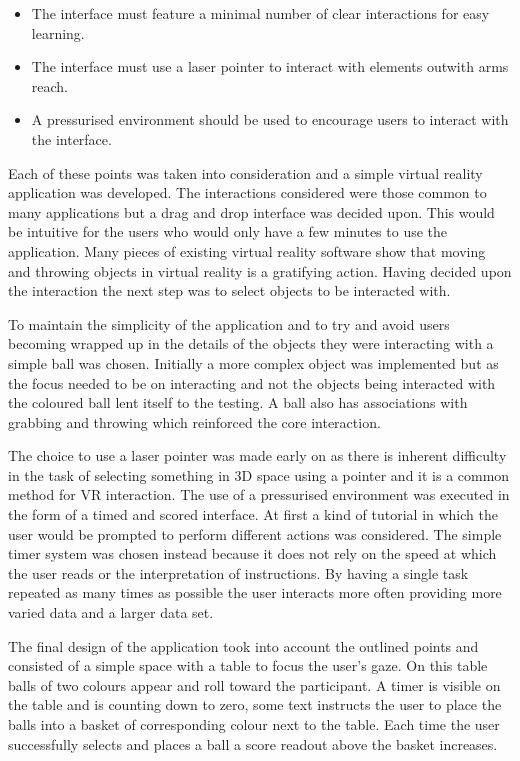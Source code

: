 \documentclass[12pt]{article}
\begin{document}
\begin{itemize}[noitemsep,topsep=0pt]
\item The interface must feature a minimal number of clear interactions for easy learning.
\item The interface must use a laser pointer to interact with elements outwith arms reach.
\item A pressurised environment should be used to encourage users to interact with the interface.
\end{itemize}

Each of these points was taken into consideration and a simple virtual reality application was developed. The interactions considered were those common to many applications but a drag and drop interface was decided upon. This would be intuitive for the users who would only have a few minutes to use the application. Many pieces of existing virtual reality software  show that moving and throwing objects in virtual reality is a gratifying action. Having decided upon the interaction the next step was to select objects to be interacted with.

To maintain the simplicity of the application and to try and avoid users becoming wrapped up in the details of the objects they were interacting with a simple ball was chosen. Initially a more complex object was implemented but as the focus needed to be on interacting and not the objects being interacted with the coloured ball lent itself to the testing. A ball also has associations with grabbing and throwing which reinforced the core interaction.

The choice to use a laser pointer was made early on as there is inherent difficulty in the task of selecting something in 3D space using a pointer and it is a common method for VR interaction. The use of a pressurised environment was executed in the form of a timed and scored interface. At first a kind of tutorial in which the user would be prompted to perform different actions was considered. The simple timer system was chosen instead because it does not rely on the speed at which the user reads or the interpretation of instructions. By having a single task repeated as many times as possible the user interacts more often providing more varied data and a larger data set.

The final design of the application took into account the outlined points and consisted of a simple space with a table to focus the user's gaze. On this table balls of two colours appear and roll toward the participant. A timer is visible on the table and is counting down to zero, some text instructs the user to place the balls into a basket of corresponding colour next to the table. Each time the user successfully selects and places a ball a score readout above the basket increases.
\end{document}
